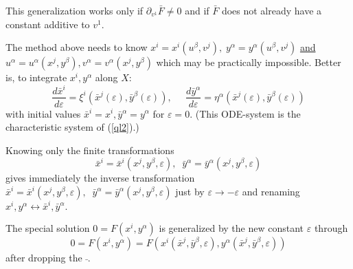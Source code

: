 This generalization works only if $\partial_{v^1}\bar{F} \neq 0$ and
if $\bar{F}$ does not already have
a constant additive to $v^1$.

The method above needs to know $x^i=x^i(u^\beta,v^j),\;
y^\alpha=y^\alpha(u^\beta,v^j)$ \underline{and}
$u^\alpha = u^\alpha(x^j,y^\beta), v^\alpha = v^\alpha(x^j,y^\beta)$
which may be practically impossible.
Better is, to integrate $x^i,y^\alpha$ along $X$:
\begin{equation}
\frac{d\bar{x}^i}{d\varepsilon} = \xi^i(\bar{x}^j(\varepsilon),
                                  \bar{y}^\beta(\varepsilon)), \;\;\;\;\;
\frac{d\bar{y}^\alpha}{d\varepsilon} = \eta^\alpha(\bar{x}^j(\varepsilon),
                                       \bar{y}^\beta(\varepsilon))
\label{ODEsys}
\end{equation}
with initial values $\bar{x}^i = x^i, \bar{y}^\alpha = y^\alpha$
for $\varepsilon = 0.$
(This ODE-system is the characteristic system of (\ref{ql2}).)

Knowing only the finite transformations
\begin{equation}
\bar{x}^i = \bar{x}^i(x^j,y^\beta,\varepsilon),\;\;
\bar{y}^\alpha = \bar{y}^\alpha(x^j,y^\beta,\varepsilon)  \label{ODEsol}
\end{equation}
gives immediately the inverse transformation
$\bar{x}^i = \bar{x}^i(x^j,y^\beta,\varepsilon),\;\;
\bar{y}^\alpha = \bar{y}^\alpha(x^j,y^\beta,\varepsilon)$
just by $\varepsilon \rightarrow -\varepsilon$ and renaming
$x^i,y^\alpha \leftrightarrow \bar{x}^i,\bar{y}^\alpha.$

The special solution $0 = F(x^i,y^\alpha)$
is generalized by the new constant
$\varepsilon$ through
\[ 0 = F(x^i,y^\alpha) = F(x^i(\bar{x}^j,\bar{y}^\beta,\varepsilon),
                  y^\alpha(\bar{x}^j,\bar{y}^\beta,\varepsilon)) \]
after dropping the $\bar{ }$.

